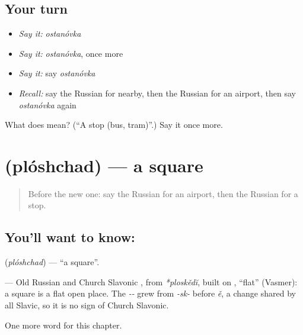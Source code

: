 \subsection*{Your turn}
\begin{itemize}
\raggedright
  \item \emph{Say it:} \emph{ostanóvka}
  \item \emph{Say it:} \emph{ostanóvka}, once more
  \item \emph{Say it:} say \emph{ostanóvka}
  \item \emph{Recall:} say the Russian for nearby, then the Russian for an airport, then say \emph{ostanóvka} again
\end{itemize}

\begin{tcolorbox}[breakable,colback=teal!4,colframe=teal!35!black,title={Before you move on}]
What does  mean? (\textquotedblleft{}A stop (bus, tram)\textquotedblright{}.) Say it once more.
\end{tcolorbox}
\section[\texorpdfstring{\ru{площадь} (plóshchad)}{площадь (plóshchad)}]{ (plóshchad) — a square}

\label{lesson:RU-C87-square}



\begin{quote}
Before the new one: say the Russian for an airport, then the Russian for a stop.
\end{quote}

\subsection*{You'll want to know: }
\textbf{} (\emph{plóshchad}) — \textquotedblleft{}a square\textquotedblright{}.

\begin{cousinweb}
\textbf{} — Old Russian and Church Slavonic \emph{}, from \emph{*ploskědĭ}, built on \emph{}, \textquotedblleft{}flat\textquotedblright{} (Vasmer): a square is a flat open place. The \emph{--} grew from \emph{-sk-} before \emph{ě}, a change shared by all Slavic, so it is no sign of Church Slavonic.
\end{cousinweb}

\begin{grammarlens}[title={What you've built}]
One more word for this chapter.
\end{grammarlens}

